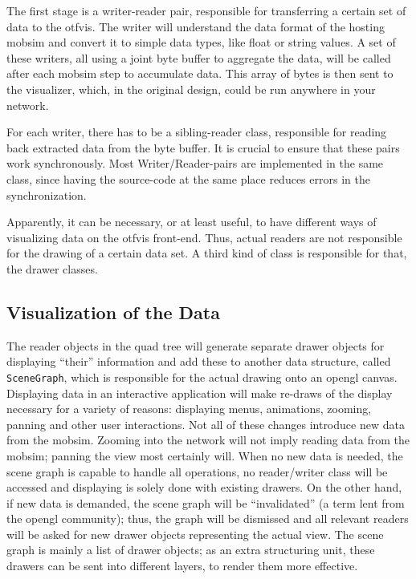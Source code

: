 The first stage is a writer-reader pair, responsible for transferring a certain set of data to the \gls{otfvis}. The writer will understand the data format of the hosting \gls{mobsim} and convert it to simple data types, like float or string values. A set of these writers, all using a joint byte buffer to aggregate the data, will be called after each \gls{mobsim} step to accumulate data. This array of bytes is then sent to the visualizer, which, in the original design, could be run anywhere in your network.

For each writer, there has to be a sibling-reader class, responsible for reading back extracted data from the byte buffer. 
It is crucial to ensure that these pairs work synchronously. Most Writer/Reader-pairs are implemented in the same class, since having the source-code at the same place reduces errors in the synchronization.

Apparently, it can be necessary, or at least useful, to have different ways of visualizing data on the \gls{otfvis} front-end. Thus, actual readers are not responsible for the drawing of a certain data set. A third kind of class is responsible for that, the drawer classes.

\subsection{Visualization of the Data}
The reader objects in the quad tree will generate separate drawer objects for displaying ``their'' information and add these to another data structure, called \lstinline|SceneGraph|, which is responsible for the actual drawing onto an \gls{opengl} canvas. 
Displaying data in an interactive application will make re-draws of the display necessary for a variety of reasons: displaying menus, animations, zooming, panning and other user interactions. 
Not all of these changes introduce new data from the \gls{mobsim}. 
Zooming into the network will not imply reading data from the \gls{mobsim}; panning the view most certainly will. 
When no new data is needed, the scene graph is capable to handle all operations, no reader/writer class will be accessed and displaying is solely done with existing drawers. 
On the other hand, if new data is demanded, the scene graph will be ``invalidated'' (a term lent from the \gls{opengl} community); thus, the graph will be dismissed and all relevant readers will be asked for new drawer objects representing the actual view. The scene graph is mainly a list of drawer objects; as an extra structuring unit, these drawers can be sent into different layers, to render them more effective.

